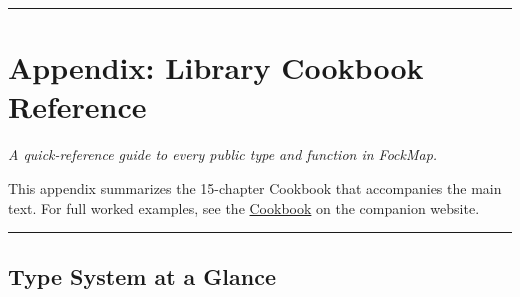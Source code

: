 \documentclass[
  11pt,
  oneside]{book}
\begin{document}
\begin{center}\rule{0.5\linewidth}{0.5pt}\end{center}

\chapter{Appendix: Library Cookbook
Reference}\label{appendix-library-cookbook-reference}

\emph{A quick-reference guide to every public type and function in
FockMap.}

This appendix summarizes the 15-chapter Cookbook that accompanies the
main text. For full worked examples, see the
\href{../docs/guides/cookbook/index.html}{Cookbook} on the companion
website.

\begin{center}\rule{0.5\linewidth}{0.5pt}\end{center}

\section{Type System at a Glance}\label{type-system-at-a-glance}
\end{document}
